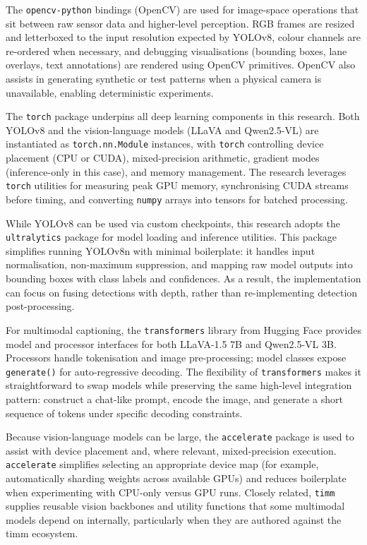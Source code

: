 \documentclass[11pt,a4paper]{article}
\newcommand{\code}[1]{\texttt{#1}}
\begin{document}
The \code{opencv-python} bindings (OpenCV) are used for image-space operations that sit between raw sensor data and higher-level perception. RGB frames are resized and letterboxed to the input resolution expected by YOLOv8, colour channels are re-ordered when necessary, and debugging visualisations (bounding boxes, lane overlays, text annotations) are rendered using OpenCV primitives. OpenCV also assists in generating synthetic or test patterns when a physical camera is unavailable, enabling deterministic experiments.

The \code{torch} package underpins all deep learning components in this research. Both YOLOv8 and the vision-language models (LLaVA and Qwen2.5-VL) are instantiated as \code{torch.nn.Module} instances, with \code{torch} controlling device placement (CPU or CUDA), mixed-precision arithmetic, gradient modes (inference-only in this case), and memory management. The research leverages \code{torch} utilities for measuring peak GPU memory, synchronising CUDA streams before timing, and converting \code{numpy} arrays into tensors for batched processing.

While YOLOv8 can be used via custom checkpoints, this research adopts the \code{ultralytics} package for model loading and inference utilities. This package simplifies running YOLOv8n with minimal boilerplate: it handles input normalisation, non-maximum suppression, and mapping raw model outputs into bounding boxes with class labels and confidences. As a result, the implementation can focus on fusing detections with depth, rather than re-implementing detection post-processing.

For multimodal captioning, the \code{transformers} library from Hugging Face provides model and processor interfaces for both LLaVA-1.5 7B and Qwen2.5-VL 3B. Processors handle tokenisation and image pre-processing; model classes expose \code{generate()} for auto-regressive decoding. The flexibility of \code{transformers} makes it straightforward to swap models while preserving the same high-level integration pattern: construct a chat-like prompt, encode the image, and generate a short sequence of tokens under specific decoding constraints.

Because vision-language models can be large, the \code{accelerate} package is used to assist with device placement and, where relevant, mixed-precision execution. \code{accelerate} simplifies selecting an appropriate device map (for example, automatically sharding weights across available GPUs) and reduces boilerplate when experimenting with CPU-only versus GPU runs. Closely related, \code{timm} supplies reusable vision backbones and utility functions that some multimodal models depend on internally, particularly when they are authored against the timm ecosystem.
\end{document}
